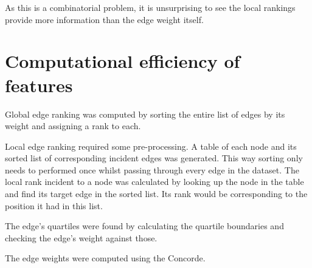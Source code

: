 \documentclass[]{UCD_CS_FYP_Report}
\begin{document}
As this is a combinatorial problem, it is unsurprising to see the local rankings provide more information than the edge weight itself.

\newpage
\section{Computational efficiency of features}
Global edge ranking was computed by sorting the entire list of edges by its weight and assigning a rank to each.

Local edge ranking required some pre-processing. A table of each node and its sorted list of corresponding incident edges was generated. This way sorting only needs to performed once whilst passing through every edge in the dataset. The local rank incident to a node was calculated by looking up the node in the table and find its target edge in the sorted list. Its rank would be corresponding to the position it had in this list.

The edge's quartiles were found by calculating the quartile boundaries and checking the edge's weight against those.

The edge weights were computed using the Concorde.
\end{document}
